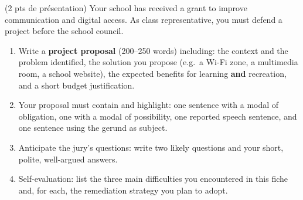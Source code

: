 \documentclass[11pt]{article}
\begin{document}
\begin{exercice} (2 pts de présentation)
Your school has received a grant to improve communication and digital access. As class representative, you must defend a project before the school council.

\begin{enumerate}
\item Write a \textbf{project proposal} (200--250 words) including: the context and the problem identified, the solution you propose (e.g.\ a Wi-Fi zone, a multimedia room, a school website), the expected benefits for learning \textbf{and} recreation, and a short budget justification.
\item Your proposal must contain and highlight: one sentence with a modal of obligation, one with a modal of possibility, one reported speech sentence, and one sentence using the gerund as subject.
\item Anticipate the jury's questions: write two likely questions and your short, polite, well-argued answers.
\item Self-evaluation: list the three main difficulties you encountered in this fiche and, for each, the remediation strategy you plan to adopt.
\end{enumerate}
\end{exercice}
\end{document}
